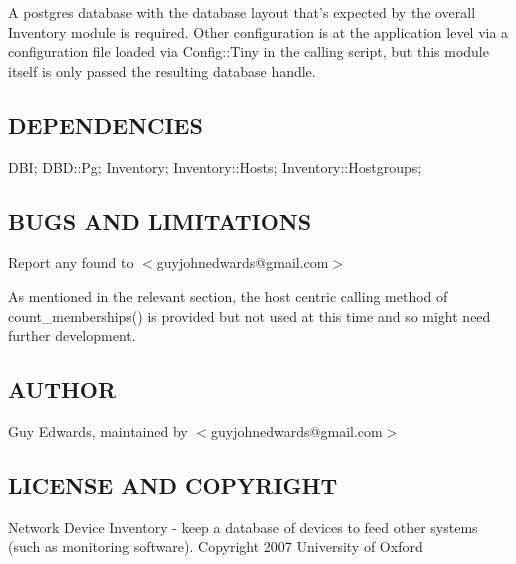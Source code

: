 \documentclass{book}
\begin{document}
A postgres database with the database layout that's expected by the overall Inventory module is required. Other configuration is at the application level via a configuration file loaded via Config::Tiny in the calling script, but this module itself is only passed the resulting database handle.


\subsection{DEPENDENCIES}
\label{Inventory::Memberships_DEPENDENCIES}
\hypertarget{Inventory::Memberships_DEPENDENCIES}{}



DBI; DBD::Pg; Inventory; Inventory::Hosts; Inventory::Hostgroups;


\subsection{BUGS AND LIMITATIONS}
\label{Inventory::Memberships_BUGS_AND_LIMITATIONS}
\hypertarget{Inventory::Memberships_BUGS_AND_LIMITATIONS}{}



Report any found to $<$guyjohnedwards@gmail.com$>$



As mentioned in the relevant section, the host centric calling method of count\_memberships() is provided but not used at this time and so might need further development.


\subsection{AUTHOR}
\label{Inventory::Memberships_AUTHOR}
\hypertarget{Inventory::Memberships_AUTHOR}{}



Guy Edwards, maintained by $<$guyjohnedwards@gmail.com$>$


\subsection{LICENSE AND COPYRIGHT}
\label{Inventory::Memberships_LICENSE_AND_COPYRIGHT}
\hypertarget{Inventory::Memberships_LICENSE_AND_COPYRIGHT}{}



Network Device Inventory - keep a database of devices to feed other systems (such as monitoring software). Copyright 2007 University of Oxford
\end{document}

